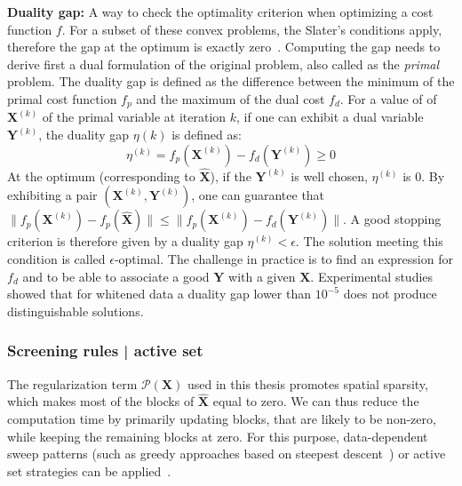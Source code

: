 \textbf{Duality gap:} A way to check the optimality criterion when optimizing a cost function $f$. For a subset of these convex problems, the Slater's conditions apply, therefore the gap at the optimum is exactly zero~\cite{Boyd_Vandenberghe04}. Computing the gap needs to derive first a dual formulation of the original problem, also called as the \textit{primal} problem. The duality gap is defined as the difference between the minimum of the primal cost function $f_p$ and the maximum of the dual cost $f_d$. For a value of of $\mathbf{X}^{(k)}$ of the primal variable at iteration $k$, if one can exhibit a dual variable $\mathbf{Y}^{(k)}$, the duality gap $\eta{(k)}$ is defined as:
\begin{equation}
\eta^{(k)}=f_p(\mathbf{X}^{(k)})-f_d(\mathbf{Y}^{(k)}) \geq 0
\end{equation}
At the optimum (corresponding to $\hat{\mathbf{X}}$), if the $\mathbf{Y}^{(k)}$ is well chosen, $\eta^{(k)}$ is $0$. By exhibiting a pair $(\mathbf{X}^{(k)}, \mathbf{Y}^{(k)})$, one can guarantee that $\|f_p(\mathbf{X}^{(k)}) - f_p(\hat{\mathbf{X}})\| \leq \|f_p(\mathbf{X}^{(k)})-f_d(\mathbf{Y}^{(k)})\|$. A good stopping criterion is therefore given by a duality gap $\eta^{(k)}<\epsilon$. The solution meeting this condition is called $\epsilon$-optimal. The challenge in practice is to find an expression for $f_d$ and to be able to associate a good $\mathbf{Y}$ with a given $\mathbf{X}$. Experimental studies showed that for whitened data a duality gap lower than $10^{-5}$ does not produce distinguishable solutions.\\


\subsubsection*{Screening rules | active set}
The regularization term $\mathcal{P}(\mathbf{X})$ used in this thesis promotes spatial sparsity, which makes most of the blocks of $\hat{\mathbf{X}}$ equal to zero. We can thus reduce the computation time by primarily updating blocks, that are likely to be non-zero, while keeping the remaining blocks at zero. For this purpose, data-dependent sweep patterns (such as greedy approaches based on steepest descent~\cite{li-osher:2009,wei2012doa}) or active set strategies can be applied~\cite{friedman-etal:2010,roth-etal:08}.\\

